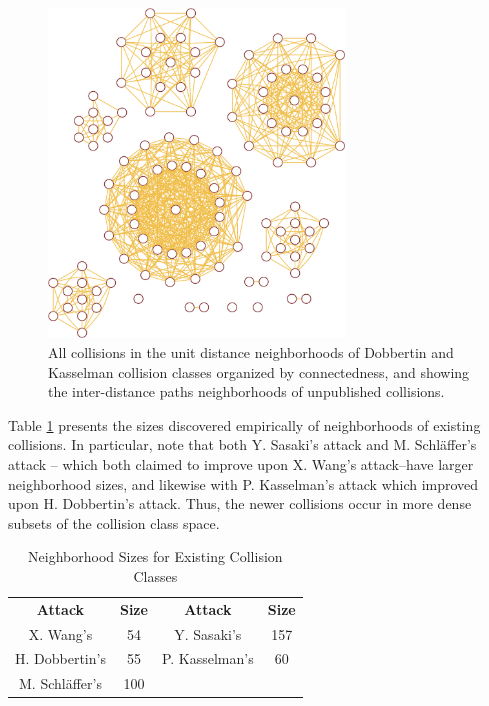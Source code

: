 \documentclass[conference]{IEEEtran}
\begin{document}
\begin{figure}
\begin{center}
\includegraphics[width=0.7\textwidth]{Figs/graph-neighborhood-crop.pdf}
\caption{All collisions in the unit distance neighborhoods of
  Dobbertin and Kasselman collision classes
  organized by connectedness, and showing the inter-distance
  paths neighborhoods of unpublished collisions.}
\label{Fig:Graph-Neighborhood}
\end{center}
\end{figure}

Table \ref{table:neighborhood} presents the sizes discovered empirically of neighborhoods
of existing collisions. In particular, note that both Y. Sasaki's attack and
M. Schl{\"a}ffer's attack -- which both claimed to improve upon X. Wang's
attack--have larger neighborhood sizes, and likewise with P. Kasselman's
attack which improved upon H. Dobbertin's attack. Thus, the newer collisions
occur in more dense subsets of the collision class space.

\begin{table}
    \caption{Neighborhood Sizes for Existing Collision Classes}
    \label{table:neighborhood}
    \begin{tabular}{c c c c}
        \textbf{Attack} & \textbf{Size} & \textbf{Attack} & \textbf{Size} \\
        X. Wang's & 54 & Y. Sasaki's & 157 \\
        H. Dobbertin's & 55 & P. Kasselman's & 60 \\
        M. Schl{\"a}ffer's & 100 & & \\
    \end{tabular}
\end{table}
\end{document}
